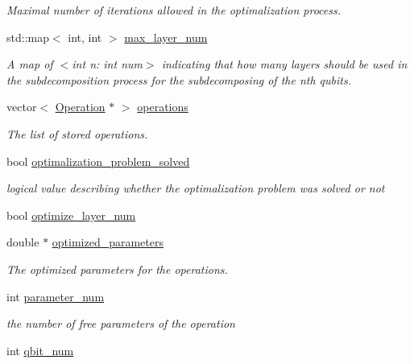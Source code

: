 \begin{DoxyCompactItemize}
\begin{DoxyCompactList}\small\item\em Maximal number of iterations allowed in the optimalization process. \end{DoxyCompactList}\item 
std\+::map$<$ int, int $>$ \hyperlink{class_decomposition___base_a861d7b10226fc13f05c131e18c8be908}{max\+\_\+layer\+\_\+num}
\begin{DoxyCompactList}\small\item\em A map of $<$int n\+: int num$>$ indicating that how many layers should be used in the subdecomposition process for the subdecomposing of the nth qubits. \end{DoxyCompactList}\item 
vector$<$ \hyperlink{class_operation}{Operation} $\ast$ $>$ \hyperlink{class_operation__block_a1efec4139888e591b59acd7b84497af1}{operations}
\begin{DoxyCompactList}\small\item\em The list of stored operations. \end{DoxyCompactList}\item 
bool \hyperlink{class_decomposition___base_ae9c42d3d9cdeeae765d6e7ebc2563d34}{optimalization\+\_\+problem\+\_\+solved}
\begin{DoxyCompactList}\small\item\em logical value describing whether the optimalization problem was solved or not \end{DoxyCompactList}\item 
bool \hyperlink{class_two___qubit___decomposition_adef11f7613b1d3025451137233c92e92}{optimize\+\_\+layer\+\_\+num}
\item 
double $\ast$ \hyperlink{class_decomposition___base_a38bb2fae99a99736eaafbf9741eb2f5d}{optimized\+\_\+parameters}
\begin{DoxyCompactList}\small\item\em The optimized parameters for the operations. \end{DoxyCompactList}\item 
int \hyperlink{class_operation_aa57505afe5b5ec27f6d053044b86e043}{parameter\+\_\+num}
\begin{DoxyCompactList}\small\item\em the number of free parameters of the operation \end{DoxyCompactList}\item 
int \hyperlink{class_operation_aecd5fbf1dd4ea532b2e58471ff8bad69}{qbit\+\_\+num}

\end{DoxyCompactItemize}
